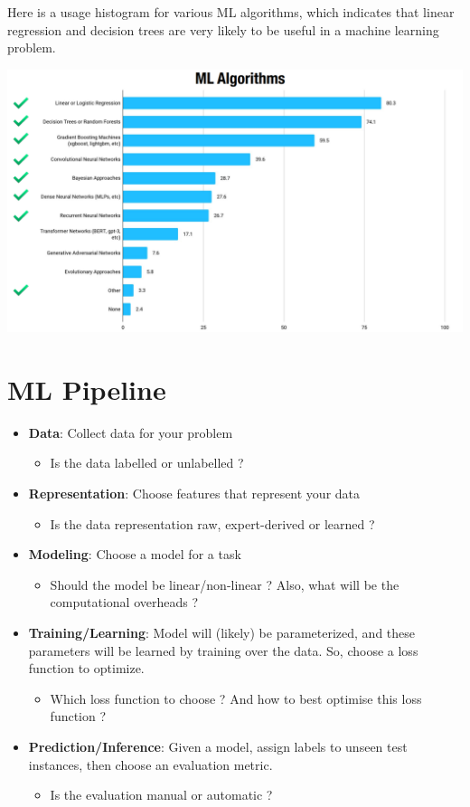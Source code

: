 \documentclass{report}
\begin{document}
Here is a usage histogram for various ML algorithms, which indicates that linear regression and decision trees are very likely to be useful in a machine learning problem.

\begin{center}
  \includegraphics[scale=0.2]{"images/aiml-02.png"}
\end{center}

\section{ML Pipeline}
\begin{itemize}
  \item \textbf{Data}: Collect data for your problem
        \begin{itemize}
          \item Is the data labelled or unlabelled ?
        \end{itemize}
  \item \textbf{Representation}: Choose features that represent your data
        \begin{itemize}
          \item Is the data representation raw, expert-derived or learned ?
        \end{itemize}
  \item \textbf{Modeling}: Choose a model for a task
        \begin{itemize}
          \item Should the model be linear/non-linear ? Also, what will be the computational overheads ?
        \end{itemize}
  \item \textbf{Training/Learning}: Model will (likely) be parameterized, and these parameters will be learned by training over the data. So, choose a loss function to optimize.
        \begin{itemize}
          \item Which loss function to choose ? And how to best optimise this loss function ?
        \end{itemize}
  \item \textbf{Prediction/Inference}: Given a model, assign labels to unseen test instances, then choose an evaluation metric.
        \begin{itemize}
          \item Is the evaluation manual or automatic ?
        \end{itemize}
\end{itemize}
\end{document}
